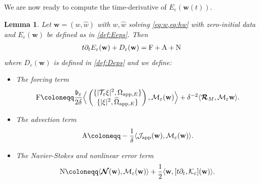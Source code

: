 \documentclass[11pt,reqno,a4paper]{amsart}
\def\eps{\varepsilon}
\def\de{{\partial}}
\newcommand{\cJ}{\mathcal{J}}
\newcommand{\cK}{\mathcal{K}}
\newcommand{\cM}{\mathcal{M}}
\newcommand{\cN}{\mathcal{N}}
\newcommand{\cR}{\mathcal{R}}
\newcommand{\cT}{\mathcal{T}}
\newcommand{\app}{\mathrm{app}}
\newcommand{\1}{\mathbbm{1}}
\newtheorem{lemma}[proposition]{Lemma}
\theoremstyle{definition}
\theoremstyle{definition}
\numberwithin{equation}{section}
\begin{document}
We are now ready to compute the time-derivative of $E_{\eps}({\mathbf w}(t))$.
\begin{lemma}
\label{lem:energy}
    Let ${\mathbf w}=(w,\widehat{w})$ with $w,\widehat{w}$ solving \cref{eq:w,eq:hw} with zero-initial data and $E_{\eps}({\mathbf w})$ be defined as in \cref{def:Eeps}. Then 
    \begin{align}
        t\de_tE_{\eps}({\mathbf w})+D_{\eps}({\mathbf w})={\rm F}+{\rm A}+{\rm N}
    \end{align}
    where $D_\eps({\mathbf w})$ is defined in \cref{def:Deps} and we define:
    \begin{itemize}[label=$\circ$]
        \item The forcing term
        \begin{align}
           \label{def:F} {\rm F}\coloneqq\frac{\mathfrak{b}_\eps}{2\delta}\Big\langle \begin{pmatrix}
                \{|\cT_\eps \xi|^2,\Omega_{\app,E}\}\\
                \{|\xi|^2,\widehat{\Omega}_{\app,E}\}
            \end{pmatrix}, \cM_{\eps}({\mathbf w}) \Big\rangle+\delta^{-2}\langle \boldsymbol{\cR}_M,\cM_{\eps}{\mathbf w}\rangle.
        \end{align}
        \item The advection term 
        \begin{align}
            \label{def:Adv}{\rm A}\coloneqq  -\frac{1}{\delta}\langle\cJ_{\rm app}({\mathbf w}),\cM_{\eps}({\mathbf w})\rangle.
        \end{align}
        \item The Navier-Stokes and nonlinear error term
        \begin{align}
          \label{def:Nen}  {\rm N}\coloneqq \langle\boldsymbol{\cN}({\mathbf w}),\cM_{\eps}({\mathbf w})\rangle+\frac12\langle {\mathbf w}, [t\de_t,\cK_{\eps}]({\mathbf w})\rangle.
        \end{align}
    \end{itemize}
\end{lemma}
\end{document}
